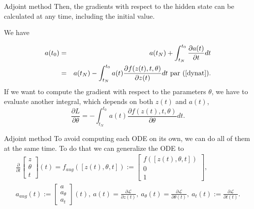 \documentclass[11pt]{beamer}
\begin{document}
\begin{frame}{Adjoint method}
Then, the gradients with respect to the hidden state can be calculated at any time, including the initial value. 

We have 

\begin{eqnarray*}
a(t_0) &=& a(t_N) + \int^{t_0}_{t_N} \frac{\partial a(t)}{\partial t} dt \\
	   &=& a(t_N) - \int^{t_0}_{t_N} a(t) \frac{\partial f(z(t),t,\theta)} {\partial z(t)} dt \text{ par (\ref{dynat})}.
\end{eqnarray*}
If we want to compute the gradient with respect to the parameters $\theta$, we have to evaluate another integral, which depends on both $z(t)$ and $a(t)$,
\begin{equation}
\label{devtheta}
\frac{\partial L}{\partial \theta} = - \int^{t_0}_{t_N} a(t) \frac{\partial f(z(t),t,\theta)} {\partial \theta} dt.
\end{equation}
\end{frame}

\begin{frame}{Adjoint method}
To avoid computing each ODE on its own, we can do all of them at the same time. To do that we can generalize the ODE to
\begin{eqnarray*}
\frac{\partial}{\partial t} \begin{bmatrix}
							z \\ \theta \\ t
							\end{bmatrix} (t) 
= f_{aug}([z(t),\theta ,t]) := \begin{bmatrix}
							f([z(t),\theta ,t]) \\ 0 \\ 1
							\end{bmatrix}, \\
a_{aug} (t) := \begin{bmatrix}
			a \\ a_{\theta} \\ a_t
			\end{bmatrix} (t) , \ 
a(t) = \frac{\partial \mathcal{L}}{\partial z(t)}, \ 
a_\theta (t) = \frac{\partial \mathcal{L}}{\partial \theta (t)}, \ 
a_t(t) := \frac{\partial \mathcal{L}}{\partial t(t)}.
\end{eqnarray*}
\end{frame}
\end{document}
